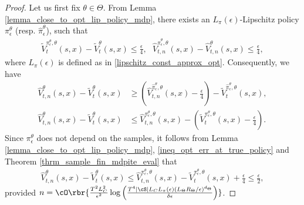 \documentclass[9pt]{article}
\numberwithin{equation}{section}
\renewcommand{\frac}[2]{\tfrac{#1}{#2}}
\begin{document}
\begin{proof}
Let us first fix $\theta \in \Theta$.  From Lemma \ref{lemma_close_to_opt_lip_policy_mdp}, there exists an $L_\pi({\epsilon})$-Lipschitz policy $\pi_\epsilon^\theta$ (resp. $\hat{\pi}_\epsilon^\theta$),  such that
\begin{align}\label{ineq_choice_epsilon_opt_policy}
    \tilde{V}^{\pi_\epsilon^\theta, \theta}_t(s,x) -  \tilde{V}^{ \theta}_t(s,x)  \leq \frac{\epsilon}{4}, ~~~
    \hat{V}^{\hat{\pi}_\epsilon^\theta, \theta}_{t,n}(s,x) -  \hat{V}^{ \theta}_{t,n}(s,x)  \leq \frac{\epsilon}{4},
\end{align}
where $L_\pi(\epsilon)$ is defined as in \eqref{lipschitz_const_approx_opt}.
Consequently, we have
%
\begin{align}
    \hat{V}_{t,n}^{\theta}(s,x) - \tilde{V}_t^{\theta}(s,x) & \geq (\hat{V}_{t,n}^{\hat{\pi}_\epsilon^\theta, \theta}(s,x) - \frac{\epsilon}{4}) - \tilde{V}_t^{\hat{\pi}_\epsilon^\theta, \theta}(s,x),  \label{ineq_opt_err_at_emp_policy} \\
    \hat{V}_{t,n}^{\theta}(s,x) - \tilde{V}_t^{\theta}(s,x) & \leq \hat{V}_{t,n}^{\pi_\epsilon^\theta, \theta}(s,x) - (\tilde{V}_t^{\pi_\epsilon^\theta, \theta}(s,x) - \frac{\epsilon}{4}). \label{ineq_opt_err_at_true_policy}
\end{align}
Since $\pi_\epsilon^\theta$ does not depend on the samples, it follows   from Lemma \ref{lemma_close_to_opt_lip_policy_mdp},  \eqref{ineq_opt_err_at_true_policy} and  Theorem \ref{thrm_sample_fin_mdpite_eval} that 
\begin{align}\label{ineq_opt_sample_pi_true}
 \hat{V}_{t,n}^{\theta}(s,x) - \tilde{V}_t^{\theta}(s,x) \leq    \hat{V}_{t,n}^{\pi_\epsilon^\theta, \theta}(s,x) - \tilde{V}_t^{\pi_\epsilon^\theta, \theta}(s,x)  + \frac{\epsilon}{4}
    \leq  \frac{\epsilon}{2},
\end{align}
provided 
$n 
= \cO \rbr{
\tfrac{T^2L_C^2}{\epsilon^2}\log \left(\tfrac{T^4 |\cS| L_C L_\pi(\epsilon) (L_\Theta R_\Theta /\epsilon)^{d_\Theta}}{\delta \epsilon}\right)
}
$.


\end{proof}
\end{document}
